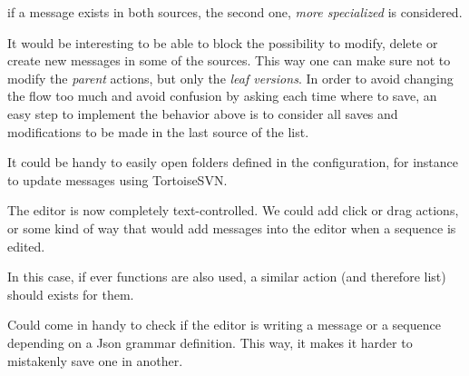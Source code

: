\documentclass[11pt]{refart}
\begin{document}
if a message exists in both sources, the second one, \emph{more specialized} is considered.

It would be interesting to be able to block the possibility to modify, delete or create new messages in some of the sources.
This way one can make sure not to modify the \emph{parent} actions, but only the \emph{leaf versions}.
In order to avoid changing the flow too much and avoid confusion by asking each time where to save, an easy step to implement the behavior above is to consider all saves and modifications to be made in the last source of the list.

It could be handy to easily open folders defined in the configuration, for instance to update messages using TortoiseSVN.

The editor is now completely text-controlled.
We could add click or drag actions, or some kind of way that would add messages into the editor when a sequence is edited.

In this case, if ever functions are also used, a similar action (and therefore list) should exists for them.

Could come in handy to check if the editor is writing a message or a sequence depending on a Json grammar definition.
This way, it makes it harder to mistakenly save one in another.
\end{document}
